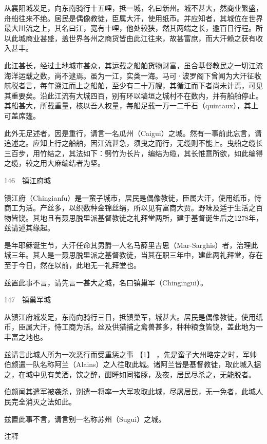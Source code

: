 \documentclass[12pt,UTF8]{ctexbook}
\begin{document}
从襄阳城发足，向东南骑行十五哩，抵一城，名曰新州。城不甚大，然商业繁盛，舟船往来不绝。居民是偶像教徒，臣属大汗，使用纸币。并应知者，其城位在世界最大川流之上，其名曰江，宽有十哩，他处较狭，然其两端之长，逾百日行程。所以此城商业甚盛，盖世界各州之商货皆由此江往来，故甚富庶，而大汗赖之获有收入甚丰。

此江甚长，经过土地城市甚众，其运载之船舶货物财富，虽合基督教民之一切江流海洋运载之数，尚不逮焉。虽为一江，实类一海。马可·波罗阁下曾闻为大汗征收航税者言，每年溯江而上之船舶，至少有二十万艘，其循江而下者尚未计焉，可见其重要矣。沿此江流有大城四百，别有环以墙垣之城村不在数内，并有船舶停止。其船甚大，所载重量，核以吾人权量，每船足载一万一二千石（quintaux），其上可盖席篷。

此外无足述者，因是重行，请言一名瓜州（Caigui）之城。然有一事前此忘言，请追述之。应知上行之船舶，因江流甚急，须曳之而行，无缆则不能上。曳船之缆长三百步，用竹结之，其法如下：劈竹为长片，编结为缆，其长惟意所欲，如此编得之缆，较之用大麻编结者为坚。





146　镇江府城

镇江府（Chingianfu）是一蛮子城市，居民是偶像教徒，臣属大汗，使用纸币，恃商工为活。产丝多，以织数种金锦丝绢，所以见有富商大贾。野味及适于生活之百物皆饶。其地且有聂思脱里派基督教徒之礼拜堂两所，建于基督诞生后之1278年，兹请述其缘起。

是年耶稣诞生节，大汗任命其男爵一人名马薛里吉思（Mar-Sarghis）者，治理此城三年。其人是一聂思脱里派之基督教徒，当其在职三年中，建此两礼拜堂，存在至于今日，然在以前，此地无一礼拜堂也。

兹置此事不言，请先言一甚大之城，名曰镇巢军（Chingingui）。





147　镇巢军城

从镇江府城发足，东南向骑行三日，抵镇巢军，城甚大。居民是偶像教徒，使用纸币，臣属大汗，恃工商为活。丝及供猎捕之禽兽甚多，种种粮食皆饶，盖此地为一丰富之地也。

兹请言此城人所为一次恶行而受重惩之事 【1】 ，先是蛮子大州略定之时，军帅伯颜遣一队名称阿兰（Alains）之人往取此城。诸阿兰皆是基督教徒，取此城入据之，在城中见有美酒，饮之醉，酣睡如同猪豚，及夜，居民尽杀之，无能脱者。

伯颜闻其遣军被袭杀，别遣一将率一大军攻取此城，尽屠居民，无一免者，此城人民完全消灭之法如此。

兹置此事不言，请言别一名称苏州（Sugui）之城。

注释
\end{document}
